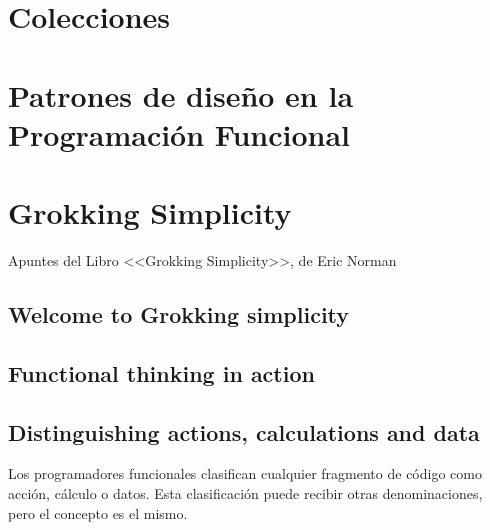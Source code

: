 \chapter{Colecciones}




\chapter{Patrones de diseño en la Programación Funcional}






\chapter{Grokking Simplicity}

\IndiceCapitulo

\begin{Resumen}   
   {\color{blue}Apuntes del Libro <<Grokking Simplicity>>, de Eric Norman \citep{normandGrokkingSimplicityTaming2021}}
\end{Resumen}

\section{Welcome to Grokking simplicity}

\section{Functional thinking in action}

\section{Distinguishing actions, calculations and data}

Los programadores funcionales clasifican cualquier fragmento de código como acción, cálculo o datos. Esta clasificación puede recibir otras denominaciones, pero el concepto es el mismo. 

